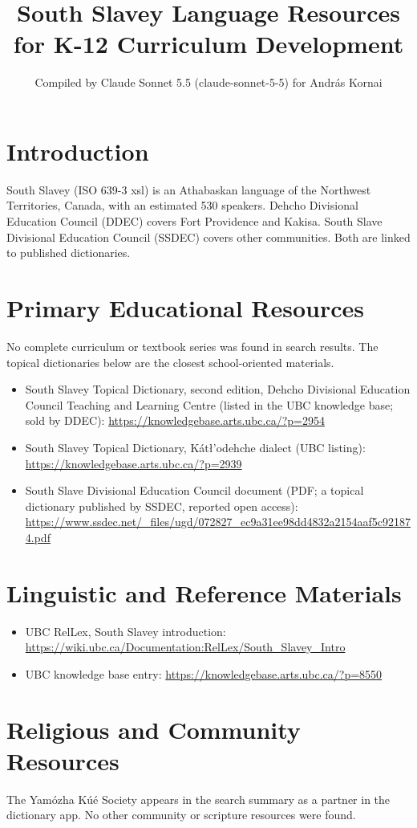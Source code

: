 \documentclass[12pt]{article}
\title{South Slavey Language Resources for K-12 Curriculum Development}
\author{Compiled by Claude Sonnet 5.5 (claude-sonnet-5-5) for Andr\'as Kornai}
\date{}
\begin{document}
\maketitle

\section{Introduction}
South Slavey (ISO 639-3 xsl) is an Athabaskan language of the Northwest Territories, Canada, with an estimated 530 speakers. Dehcho Divisional Education Council (DDEC) covers Fort Providence and Kakisa. South Slave Divisional Education Council (SSDEC) covers other communities. Both are linked to published dictionaries.

\section{Primary Educational Resources}
No complete curriculum or textbook series was found in search results. The topical dictionaries below are the closest school-oriented materials.
\begin{itemize}
\item South Slavey Topical Dictionary, second edition, Dehcho Divisional Education Council Teaching and Learning Centre (listed in the UBC knowledge base; sold by DDEC): \url{https://knowledgebase.arts.ubc.ca/?p=2954}
\item South Slavey Topical Dictionary, K\'atł'odehche dialect (UBC listing): \url{https://knowledgebase.arts.ubc.ca/?p=2939}
\item South Slave Divisional Education Council document (PDF; a topical dictionary published by SSDEC, reported open access): \url{https://www.ssdec.net/_files/ugd/072827_ec9a31ee98dd4832a2154aaf5c921874.pdf}
\end{itemize}

\section{Linguistic and Reference Materials}
\begin{itemize}
\item UBC RelLex, South Slavey introduction: \url{https://wiki.ubc.ca/Documentation:RelLex/South_Slavey_Intro}
\item UBC knowledge base entry: \url{https://knowledgebase.arts.ubc.ca/?p=8550}
\end{itemize}

\section{Religious and Community Resources}
The Yam\'ozha K\'u\'e Society appears in the search summary as a partner in the dictionary app. No other community or scripture resources were found.
\end{document}
